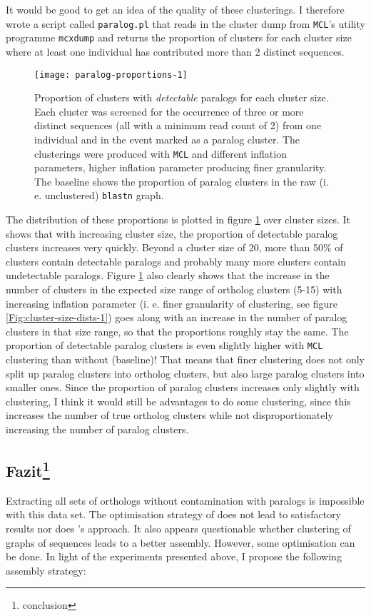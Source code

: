 \documentclass{article}\usepackage[]{graphicx}\usepackage[]{color}
\begin{document}
It would be good to get an idea of the quality of these clusterings. I therefore wrote a script called \texttt{paralog.pl} that reads in the cluster dump from \texttt{MCL}'s utility programme \texttt{mcxdump} and returns the proportion of clusters for each cluster size where at least one individual has contributed more than 2 distinct sequences.
\begin{figure}
\centering
\texttt{[image: paralog-proportions-1]}
\caption{Proportion of clusters with \emph{detectable} paralogs for each cluster size. Each cluster was screened for the occurrence of three or more distinct sequences (all with a minimum read count of 2) from one individual and in the event marked as a paralog cluster. The clusterings were produced with \texttt{MCL} and different inflation parameters, higher inflation parameter producing finer granularity. The baseline shows the proportion of paralog clusters in the raw (i. e. unclustered) \texttt{blastn} graph.}
\label{Fig:paralog-proportions-1}
\end{figure}
The distribution of these proportions is plotted in figure \ref{Fig:paralog-proportions-1} over cluster sizes. It shows that with increasing cluster size, the proportion of detectable paralog clusters increases very quickly. Beyond a cluster size of 20, more than 50\% of clusters contain detectable paralogs and probably many more clusters contain undetectable paralogs. Figure  \ref{Fig:paralog-proportions-1} also clearly shows that the increase in the number of clusters in the expected size range of ortholog clusters (5-15) with increasing inflation parameter (i. e. finer granularity of clustering, see figure \ref{Fig:cluster-size-dists-1}) goes along with an increase in the number of paralog clusters in that size range, so that the proportions roughly stay the same. The proportion of detectable paralog clusters is even slightly higher with \texttt{MCL} clustering than without (baseline)! That means that finer clustering does not only split up paralog clusters into ortholog clusters, but also large paralog clusters into smaller ones. Since the proportion of paralog clusters increases only slightly with clustering, I think it would still be advantages to do some clustering, since this increases the number of true ortholog clusters while not disproportionately increasing the number of paralog clusters.

\subsection{Fazit\protect\footnote{conclusion}}
Extracting all sets of orthologs without contamination with paralogs is impossible with this data set. The optimisation strategy of \cite{Ilut2014} does not lead to satisfactory results nor does \cite{Roettger2013}'s approach. It also appears questionable whether clustering of graphs of sequences leads to a better assembly.  
However, some optimisation can be done. In light of the experiments presented above, I propose the following assembly strategy:
\end{document}
